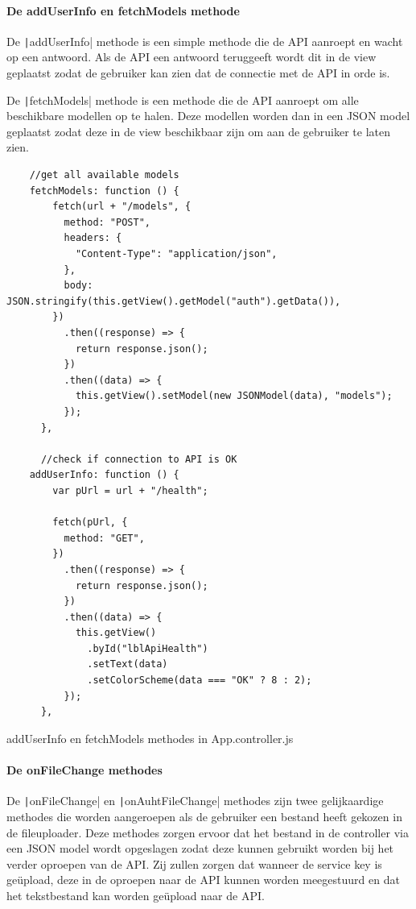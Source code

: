 \paragraph{De addUserInfo en fetchModels methode}

De \texttt|addUserInfo| methode is een simple methode die de API aanroept en wacht op een antwoord. Als de API een antwoord teruggeeft wordt dit in de view geplaatst zodat de gebruiker kan zien dat de connectie met de API in orde is.

De \texttt|fetchModels| methode is een methode die de API aanroept om alle beschikbare modellen op te halen. Deze modellen worden dan in een JSON model geplaatst zodat deze in de view beschikbaar zijn om aan de gebruiker te laten zien.

\begin{listing}[H]
\begin{verbatim}
    //get all available models
    fetchModels: function () {
        fetch(url + "/models", {
          method: "POST",
          headers: {
            "Content-Type": "application/json",
          },
          body: JSON.stringify(this.getView().getModel("auth").getData()),
        })
          .then((response) => {
            return response.json();
          })
          .then((data) => {
            this.getView().setModel(new JSONModel(data), "models");
          });
      },

      //check if connection to API is OK
    addUserInfo: function () {
        var pUrl = url + "/health";

        fetch(pUrl, {
          method: "GET",
        })
          .then((response) => {
            return response.json();
          })
          .then((data) => {
            this.getView()
              .byId("lblApiHealth")
              .setText(data)
              .setColorScheme(data === "OK" ? 8 : 2);
          });
      },
\end{verbatim}
\caption{addUserInfo en fetchModels methodes in App.controller.js}
\end{listing}

\paragraph{De onFileChange methodes}

De \texttt|onFileChange| en \texttt|onAuhtFileChange| methodes zijn twee gelijkaardige methodes die worden aangeroepen als de gebruiker een bestand heeft gekozen in de fileuploader. Deze methodes zorgen ervoor dat het bestand in de controller via een JSON model wordt opgeslagen zodat deze kunnen gebruikt worden bij het verder oproepen van de API. Zij zullen zorgen dat wanneer de service key is geüpload, deze in de oproepen naar de API kunnen worden meegestuurd en dat het tekstbestand kan worden geüpload naar de API. 

